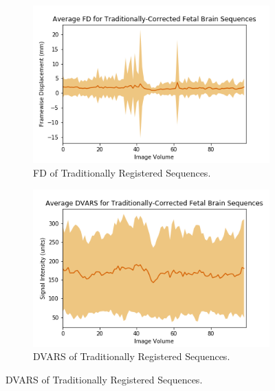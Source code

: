 \begin{figure}[t]
	\begin{subfigure}{0.4\textwidth}
		\centering
		\includegraphics[width=1.0\textwidth]{6/figures/fetal-brain-trad-fd-150.png}
		\caption{FD of Traditionally Registered Sequences.}
	\end{subfigure}
	\hspace{0.05\textwidth}
	\begin{subfigure}{0.4\textwidth}
		\centering
		\includegraphics[width=1.0\textwidth]{6/figures/fetal-brain-trad-dvars-150.png}
		\caption{DVARS of Traditionally Registered Sequences.}
	\end{subfigure}
	

\end{figure}
